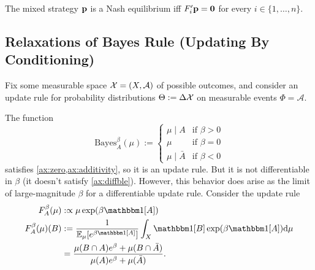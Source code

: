 \documentclass{article}
\begin{document}
\begin{prop}
    The mixed strategy $\mathbf{p}$ is a Nash equilibrium iff 
    $ F'_{i}\mathbf{p} = \mathbf{0}$ for every $i \in \{1, \ldots, n\}$.
\end{prop}









\subsection{Relaxations of Bayes Rule (Updating By Conditioning)}
Fix some measurable space $\mathcal X = (X, \mathcal A)$ of possible outcomes, and consider an update rule for probability distributions $\Theta := \Delta\mathcal X$
on measurable events $\Phi = \mathcal A$.

The function
\[
	\mathrm{Bayes}^\beta_A(\mu) := \begin{cases}
			\mu \mid A &  \text{if }\beta > 0 \\
			\mu & \text{if } \beta = 0 \\
			\mu \mid \bar A &  \text{if } \beta < 0
		\end{cases}
\]
satisfies \cref{ax:zero,ax:additivity}, so it is an update rule.  But it is not differentiable in $\beta$ (it doesn't satisfy \cref{ax:diffble}).
However, this behavior does arise as the limit of large-magnitude $\beta$ for a differentiable update rule. Consider the update rule
\begin{align*}
	F^\beta_A (\mu) &:\propto \mu \exp(\beta \mathbbm1[A]) \\
	F^\beta_A (\mu)(B) &:=
		\frac{1}{\Ex_{\mu}[e^{\beta\mathbbm1[A]}]}\int_{X}  \mathbbm1[B] \exp(\beta \mathbbm1[A]) \mathrm d\mu \\
		&=
		\frac{\mu(B\cap A)e^{\beta} + \mu(B \cap \bar A) }
		{\mu(A)e^{\beta} + \mu(\bar A)}.
\end{align*}
\end{document}
